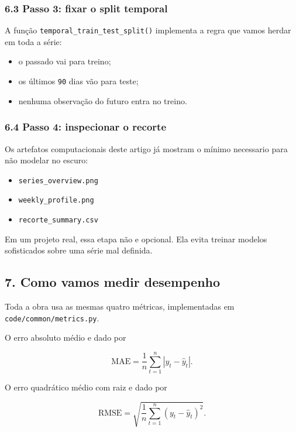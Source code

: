 \documentclass[12pt]{article}
\providecommand{\tightlist}{%
          \setlength{\itemsep}{0pt}\setlength{\parskip}{0pt}}
\begin{document}
\subsubsection{6.3 Passo 3: fixar o split temporal}\label{63-passo-3-fixar-o-split-temporal}

A função \texttt{temporal\_train\_test\_split()} implementa a regra que vamos herdar em toda a série:

\begin{itemize}
\tightlist
\item
  o passado vai para treino;
\item
  os últimos \texttt{90} dias vão para teste;
\item
  nenhuma observação do futuro entra no treino.
\end{itemize}

\subsubsection{6.4 Passo 4: inspecionar o recorte}\label{64-passo-4-inspecionar-o-recorte}

Os artefatos computacionais deste artigo já mostram o mínimo necessario para não modelar no escuro:

\begin{itemize}
\tightlist
\item
  \texttt{series\_overview.png}
\item
  \texttt{weekly\_profile.png}
\item
  \texttt{recorte\_summary.csv}
\end{itemize}

Em um projeto real, essa etapa não e opcional. Ela evita treinar modelos sofisticados sobre uma série mal definida.

\subsection{7. Como vamos medir desempenho}\label{7-como-vamos-medir-desempenho}

Toda a obra usa as mesmas quatro métricas, implementadas em \texttt{code/common/metrics.py}.

O erro absoluto médio e dado por

\[
\mathrm{MAE} = \frac{1}{n} \sum_{t=1}^n |y_t - \hat{y}_t|.
\]

O erro quadrático médio com raiz e dado por

\[
\mathrm{RMSE} = \sqrt{\frac{1}{n} \sum_{t=1}^n (y_t - \hat{y}_t)^2}.
\]
\end{document}

